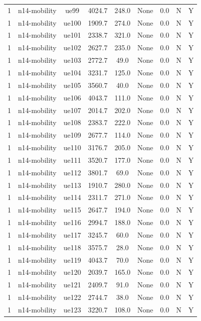 \begin{table}[ht]
\begin{tabular}{|c|c|c|c|c|c|c|c|c|}
1 & n14-mobility & ue99 & 4024.7 & 248.0 & None & 0.0 & N & Y \\
1 & n14-mobility & ue100 & 1909.7 & 274.0 & None & 0.0 & N & Y \\
1 & n14-mobility & ue101 & 2338.7 & 321.0 & None & 0.0 & N & Y \\
1 & n14-mobility & ue102 & 2627.7 & 235.0 & None & 0.0 & N & Y \\
1 & n14-mobility & ue103 & 2772.7 & 49.0 & None & 0.0 & N & Y \\
1 & n14-mobility & ue104 & 3231.7 & 125.0 & None & 0.0 & N & Y \\
1 & n14-mobility & ue105 & 3560.7 & 40.0 & None & 0.0 & N & Y \\
1 & n14-mobility & ue106 & 4043.7 & 111.0 & None & 0.0 & N & Y \\
1 & n14-mobility & ue107 & 2014.7 & 202.0 & None & 0.0 & N & Y \\
1 & n14-mobility & ue108 & 2383.7 & 222.0 & None & 0.0 & N & Y \\
1 & n14-mobility & ue109 & 2677.7 & 114.0 & None & 0.0 & N & Y \\
1 & n14-mobility & ue110 & 3176.7 & 205.0 & None & 0.0 & N & Y \\
1 & n14-mobility & ue111 & 3520.7 & 177.0 & None & 0.0 & N & Y \\
1 & n14-mobility & ue112 & 3801.7 & 69.0 & None & 0.0 & N & Y \\
1 & n14-mobility & ue113 & 1910.7 & 280.0 & None & 0.0 & N & Y \\
1 & n14-mobility & ue114 & 2311.7 & 271.0 & None & 0.0 & N & Y \\
1 & n14-mobility & ue115 & 2647.7 & 194.0 & None & 0.0 & N & Y \\
1 & n14-mobility & ue116 & 2994.7 & 188.0 & None & 0.0 & N & Y \\
1 & n14-mobility & ue117 & 3245.7 & 60.0 & None & 0.0 & N & Y \\
1 & n14-mobility & ue118 & 3575.7 & 28.0 & None & 0.0 & N & Y \\
1 & n14-mobility & ue119 & 4043.7 & 70.0 & None & 0.0 & N & Y \\
1 & n14-mobility & ue120 & 2039.7 & 165.0 & None & 0.0 & N & Y \\
1 & n14-mobility & ue121 & 2409.7 & 91.0 & None & 0.0 & N & Y \\
1 & n14-mobility & ue122 & 2744.7 & 38.0 & None & 0.0 & N & Y \\
1 & n14-mobility & ue123 & 3220.7 & 108.0 & None & 0.0 & N & Y \\

\end{tabular}
\end{table}
